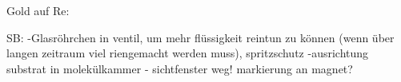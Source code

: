 Gold auf Re:





SB:
-Glasröhrchen in ventil, um mehr flüssigkeit reintun zu können (wenn über langen zeitraum viel riengemacht
werden muss), spritzschutz
-ausrichtung substrat in molekülkammer - sichtfenster weg! markierung an magnet?
